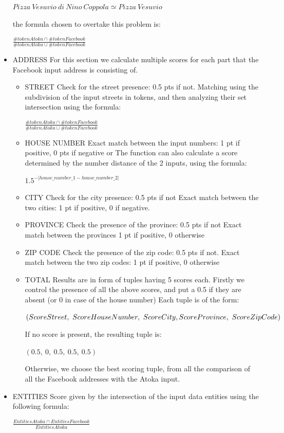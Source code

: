 \begin{itemize}
	$ Pizza\ Vesuvio\ di\ Nino\ Coppola \simeq Pizza\ Vesuvio $
	
	the formula chosen to overtake this problem is:
	
	$
		\frac{\#tokenAtoka \cap \#tokenFacebook}{\#tokenAtoka \cup \#tokenFacebook}
	$

    \item ADDRESS
	For this section we calculate multiple scores for each part that the Facebook input address is consisting of.
	\begin{itemize}
    
        \item STREET
		Check for the street presence: 0.5 pts if not.
		Matching using the subdivision of the input streets in tokens, and then analyzing their set intersection using the formula:
		
		$
		\frac{\#tokenAtoka \cap \#tokenFacebook}{\#tokenAtoka \cup \#tokenFacebook}
	    $
	    
	\item HOUSE NUMBER
		Exact match between the input numbers: 1 pt if positive, 0 pts if negative
		or
		The function can also calculate a score determined by the number distance of the 2 inputs, using the formula:
		
		$
		1.5^{-|house\_number\_1-house\_number\_2|}
		$
	\item CITY
		Check for the city presence: 0.5 pts if not
		Exact match between the two cities: 1 pt if positive, 0 if negative.
		
	\item PROVINCE
		Check the presence of the province: 0.5 pts if not
		Exact match between the provinces 1 pt if positive, 0 otherwise
		
	\item ZIP CODE
		Check the presence of the zip code: 0.5 pts if not.
		Exact match between the two zip codes: 1 pt if positive, 0 otherwise
	
	\item TOTAL
		Results are in form of tuples having 5 scores each. Firstly we control the presence of all the above scores, and put a 0.5 if they are absent (or 0 in case of the house number)
		Each tuple is of the form:
		
		$
		(ScoreStreet,\ ScoreHouseNumber,\ ScoreCity, \\ ScoreProvince,\ ScoreZipCode)
		$
		
		If no score is present, the resulting tuple is:
		
		$(0.5,\ 0,\ 0.5,\ 0.5,\ 0.5)$
		
		Otherwise, we choose the best scoring tuple, from all the comparison of all the Facebook addresses with the Atoka input.
		
	\end{itemize}
	
    \item ENTITIES
	Score given by the intersection of the input data entities using the following formula:
	
	$
	\frac{EntitiesAtoka \cap EntitiesFacebook}{EntitiesAtoka}
	$
\end{itemize}

